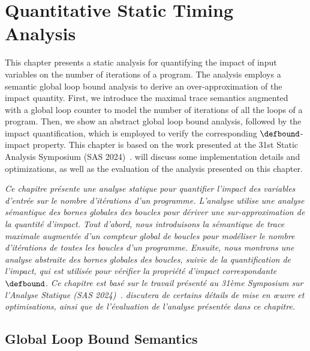 
\setchapterpreamble[u]{\margintoc}

\chapter{Quantitative Static Timing Analysis}


\marginemptybox{6.8cm}

This chapter presents a static analysis for quantifying the impact of input variables on the number of iterations of a program.
The analysis employs a semantic global loop bound analysis to derive an over-approximation of the impact quantity.
First, we introduce the maximal trace semantics augmented with a global loop counter to model the number of iterations of all the loops of a program.
Then, we show an abstract global loop bound analysis, followed by the impact quantification, which is employed to verify the corresponding $\defbound$-impact property.
This chapter is based on the work presented at the 31st Static Analysis Symposium (SAS 2024)~.
 will discuss some implementation details and optimizations, as well as the evaluation of the analysis presented on this chapter.


\frenchdiv

\emph{Ce chapitre présente une analyse statique pour quantifier l'impact des variables d'entrée sur le nombre d'itérations d'un programme. L'analyse utilise une analyse sémantique des bornes globales des boucles pour dériver une sur-approximation de la quantité d'impact. Tout d'abord, nous introduisons la sémantique de trace maximale augmentée d'un compteur global de boucles pour modéliser le nombre d'itérations de toutes les boucles d'un programme. Ensuite, nous montrons une analyse abstraite des bornes globales des boucles, suivie de la quantification de l'impact, qui est utilisée pour vérifier la propriété d'impact correspondante $\defbound$. Ce chapitre est basé sur le travail présenté au 31ème Symposium sur l'Analyse Statique (SAS 2024)~\cite{Mazzucato2024c}.  discutera de certains détails de mise en œuvre et optimisations, ainsi que de l'évaluation de l'analyse présentée dans ce chapitre.}



\section{Global Loop Bound Semantics}


